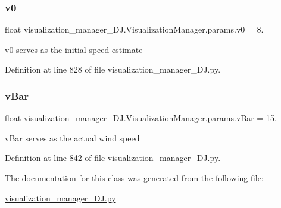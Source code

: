 \subsubsection{\texorpdfstring{v0}{v0}}
{\footnotesize\ttfamily float visualization\+\_\+manager\+\_\+\+D\+J.\+Visualization\+Manager.\+params.\+v0 = 8.\hspace{0.3cm}{\ttfamily [static]}}



v0 serves as the initial speed estimate 



Definition at line 828 of file visualization\+\_\+manager\+\_\+\+D\+J.\+py.

\mbox{\label{classvisualization__manager___d_j_1_1_visualization_manager_1_1params_a468678d5806ec035d997a40604e291f2}} 
\subsubsection{\texorpdfstring{v\+Bar}{vBar}}
{\footnotesize\ttfamily float visualization\+\_\+manager\+\_\+\+D\+J.\+Visualization\+Manager.\+params.\+v\+Bar = 15.\hspace{0.3cm}{\ttfamily [static]}}



v\+Bar serves as the \textquotesingle{}actual\textquotesingle{} wind speed 



Definition at line 842 of file visualization\+\_\+manager\+\_\+\+D\+J.\+py.



The documentation for this class was generated from the following file\+:\begin{DoxyCompactItemize}
\item 
\mbox{\hyperlink{visualization__manager___d_j_8py}{visualization\+\_\+manager\+\_\+\+D\+J.\+py}}\end{DoxyCompactItemize}
